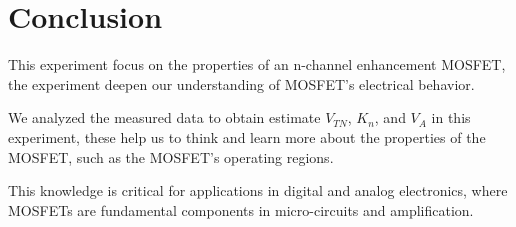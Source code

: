 \section{Conclusion}
This experiment focus on the properties of an n-channel enhancement MOSFET, the experiment deepen our understanding of MOSFET's electrical behavior.\par
We analyzed the measured data to obtain estimate $V_{TN}$, $K_n$, and $V_A$ in this experiment, these help us to think and learn more about the properties of the MOSFET, such as the MOSFET's operating regions.\par
This knowledge is critical for applications in digital and analog electronics, where MOSFETs are fundamental components in micro-circuits and amplification.
